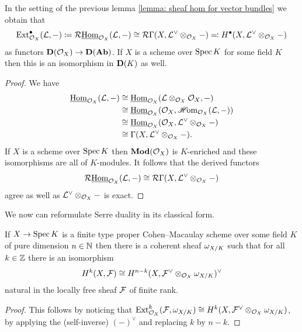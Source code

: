 \begin{corollary}
\label{corollary: ext of vector bundle}

In the setting of the previous lemma \ref{lemma: sheaf hom for vector bundles} we obtain that
$${\operatorname{Ext}}^\bullet_{{{\mathcal{O}}_{X}}} ({\mathcal{L}}, -) \coloneqq \mathcal{R}{\underline{\operatorname{Hom}}}_{{{\mathcal{O}}_{X}}}({\mathcal{L}}, -) \cong \mathcal{R} \Gamma(X, {\mathcal{L}}^\vee \otimes_{{{\mathcal{O}}_{X}}} -) \eqqcolon H^\bullet(X, {\mathcal{L}}^\vee \otimes_{{{\mathcal{O}}_{X}}} -)$$
as functors ${{\mathbf{D}}({{\mathcal{O}}_{X}})}\to{{\mathbf{D}}({{\mathbf{Ab}}})}$. If $X$ is a scheme over $\operatorname{Spec} K$ for some field $K$ then this is an isomorphism in ${{\mathbf{D}}(K)}$ as well.
\end{corollary}
\begin{proof}
We have
\begin{align*}
	{\underline{\operatorname{Hom}}}_{{{\mathcal{O}}_{X}}}({\mathcal{L}}, -)&\cong {\underline{\operatorname{Hom}}}_{{{\mathcal{O}}_{X}}}({\mathcal{L}}\otimes_{{{\mathcal{O}}_{X}}} {{\mathcal{O}}_{X}}, -)\\
	&\cong {\underline{\operatorname{Hom}}}_{{{\mathcal{O}}_{X}}}({{\mathcal{O}}_{X}}, {\operatorname{\mathscr{H}\!om}}_{{{\mathcal{O}}_{X}}}({\mathcal{L}}, -))\\
	& \cong {\underline{\operatorname{Hom}}}_{{{\mathcal{O}}_{X}}}({{\mathcal{O}}_{X}}, {\mathcal{L}}^\vee\otimes_{{{\mathcal{O}}_{X}}} -)\\
	&\cong \Gamma(X, {\mathcal{L}}^\vee \otimes_{{{\mathcal{O}}_{X}}} -).
\end{align*}
If $X$ is a scheme over $\operatorname{Spec} K$ then ${{\mathbf{Mod}}({{\mathcal{O}}_{X}})}$ is $K$-enriched and these isomorphisms are all of $K$-modules. It follows that the derived functors
$$\mathcal{R}{\underline{\operatorname{Hom}}}_{{{\mathcal{O}}_{X}}}({\mathcal{L}}, -) \cong \mathcal{R}\Gamma(X, {\mathcal{L}}^\vee\otimes_{{{\mathcal{O}}_{X}}} -)$$
agree as well as ${\mathcal{L}}^\vee\otimes_{{\mathcal{O}}_{X}}-$ is exact.
\end{proof}

We now can reformulate Serre duality in its classical form.
\begin{corollary}
\label{theorem: serre duality}

	If $X\to \operatorname{Spec} K$ is a finite type proper Cohen--Macaulay scheme over some field $K$ of pure dimension $n\in {\mathbb{N}}$ then there is a coherent sheaf $\omega_{X/K}$ such that for all $k\in {\mathbb{Z}}$ there is an isomorphism
	$$H^k(X, {\mathcal{F}}) \cong H^{n-k}(X, {\mathcal{F}}^\vee \otimes_{{{\mathcal{O}}_{X}}} \omega_{X/K})^\vee$$
	natural in the locally free sheaf ${\mathcal{F}}$ of finite rank.
\end{corollary}
\begin{proof}
	This follows by noticing that ${\operatorname{Ext}}^k_{{{\mathcal{O}}_{X}}}({\mathcal{F}}, \omega_{X/K})\cong H^k(X, {\mathcal{F}}^\vee \otimes_{{{\mathcal{O}}_{X}}} \omega_{X/K})$, by applying the (self-inverse) $(-)^\vee$ and replacing $k$ by $n-k$.
\end{proof}


